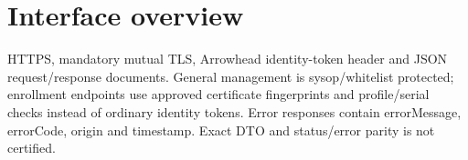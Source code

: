 \documentclass[a4paper]{arrowhead}
\begin{document}
\ArrowheadSetup
\section{Interface overview}
HTTPS, mandatory mutual TLS, Arrowhead identity-token header and JSON request/response documents. General management is sysop/whitelist protected; enrollment endpoints use approved certificate fingerprints and profile/serial checks instead of ordinary identity tokens. Error responses contain errorMessage, errorCode, origin and timestamp. Exact DTO and status/error parity is not certified.
\end{document}
